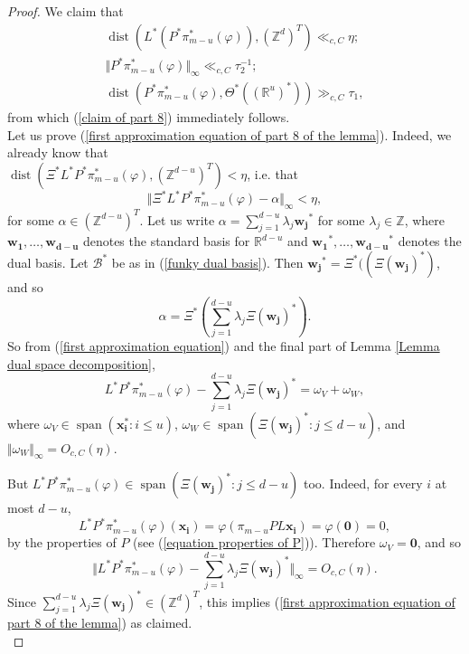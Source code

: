 \documentclass[12pt,a4paper,twoside,reqno]{amsart}
\newcommand{\dist}{\operatorname{dist}}
\newcommand{\spn}{\operatorname{span}}
\numberwithin{equation}{section}
\begin{document}
\begin{proof}
We claim that 
\begin{align}
\label{first approximation equation of part 8 of the lemma}
\dist(L^*(P^*\pi_{m-u}^*(\varphi)),(\mathbb{Z}^d)^T) \ll_{c,C}\eta;\\
\label{second approximation equation of part 8 of the lemma}
\Vert P^*\pi_{m-u}^*(\varphi)\Vert_\infty \ll_{c,C} \tau_2^{-1};\\
\label{third approximation equation of part 8 of the lemma}
\dist(P^*\pi_{m-u}^*(\varphi), \Theta^*((\mathbb{R}^{u})^*)) \gg_{c,C} \tau_1, 
\end{align}
\noindent from which (\ref{claim of part 8}) immediately follows. \\

Let us prove (\ref{first approximation equation of part 8 of the lemma}). Indeed, we already know that\\ $\dist( \Xi^* L^* P^* \pi_{m-u}^*(\varphi),(\mathbb{Z}^{d-u})^T) <\eta$, i.e. that 
\begin{equation}
\label{first approximation equation}
 \Vert \Xi^* L^* P^* \pi_{m-u}^*(\varphi) - \alpha\Vert_\infty <\eta,
 \end{equation} for some $\alpha \in (\mathbb{Z}^{d-u})^T$. Let us write $\alpha = \sum_{j=1}^{d-u} \lambda_j\mathbf{w_j}^*$ for some $\lambda_j \in \mathbb{Z}$, where $\mathbf{w_1},\dots,\mathbf{w_{d-u}}$ denotes the standard basis for $\mathbb{R}^{d-u}$ and $\mathbf{w_1}^*,\dots,\mathbf{w_{d-u}}^*$ denotes the dual basis. Let $\mathcal{B}^*$ be as in (\ref{funky dual basis}). Then $\mathbf{w_j}^* = \Xi^*((\Xi(\mathbf{w_j})^*)$, and so \[ \alpha = \Xi^*(\sum\limits_{j=1}^{d-u} \lambda_j \Xi(\mathbf{w_j}) ^*).\] So from (\ref{first approximation equation}) and the final part of Lemma \ref{Lemma dual space decomposition}, 
\begin{equation}
L^*P^* \pi_{m-u}^*(\varphi) - \sum\limits_{j=1}^{d-u} \lambda_j \Xi(\mathbf{w_j}) ^* = \omega_V + \omega_W,
\end{equation}
\noindent where $\omega_V \in \spn(\mathbf{x_i^*}:i\leqslant u)$, $\omega_W \in \spn(\Xi(\mathbf{w_j})^*:j\leqslant d-u)$, and $\Vert\omega_W\Vert_\infty = O_{c,C}(\eta)$. 

But $L^*P^* \pi_{m-u}^*(\varphi) \in \spn(\Xi(\mathbf{w_j})^*:j\leqslant d-u)$ too. Indeed, for every $i$ at most $d-u$,
\[L^*P^* \pi_{m-u}^*(\varphi)(\mathbf{x_i}) = \varphi (\pi_{m-u} PL\mathbf{x_i}) = \varphi(\mathbf{0}) = 0,\] by the properties of $P$ (see (\ref{equation properties of P})). Therefore $\omega_V = \mathbf{0}$, and so \[\Vert L^*P^* \pi_{m-u}^*(\varphi) - \sum\limits_{j=1}^{d-u} \lambda_j \Xi(\mathbf{w_j}) ^*\Vert_\infty = O_{c,C}(\eta).\] Since  $\sum_{j=1}^{d-u} \lambda_j \Xi(\mathbf{w_j}) ^* \in (\mathbb{Z}^d)^T$, this implies (\ref{first approximation equation of part 8 of the lemma}) as claimed.\\



\end{proof}
\end{document}
